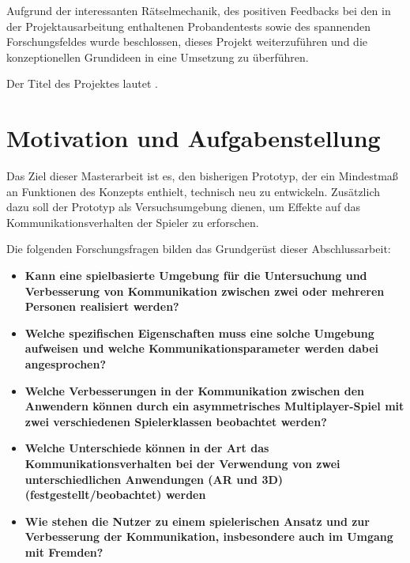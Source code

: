 Aufgrund der interessanten Rätselmechanik, des positiven Feedbacks bei den in der Projektausarbeitung enthaltenen Probandentests sowie des spannenden Forschungsfeldes wurde beschlossen, dieses Projekt weiterzuführen und die konzeptionellen Grundideen in eine Umsetzung zu überführen.

Der Titel des Projektes lautet .

\section{Motivation und Aufgabenstellung}
Das Ziel dieser Masterarbeit ist es, den bisherigen Prototyp, der ein Mindestmaß an Funktionen des Konzepts enthielt, technisch neu zu entwickeln. Zusätzlich dazu soll der Prototyp als Versuchsumgebung dienen, um Effekte auf das Kommunikationsverhalten der Spieler zu erforschen. 

Die folgenden Forschungsfragen bilden das Grundgerüst dieser Abschlussarbeit:


\begin{itemize}
    \item \textbf{Kann eine spielbasierte Umgebung für die Untersuchung und Verbesserung von Kommunikation zwischen zwei oder mehreren Personen realisiert werden?}
    \item \textbf{Welche spezifischen Eigenschaften muss eine solche Umgebung aufweisen und welche Kommunikationsparameter werden dabei angesprochen?}
    \item \textbf{Welche Verbesserungen in der Kommunikation zwischen den Anwendern können durch ein asymmetrisches Multiplayer-Spiel mit zwei verschiedenen Spielerklassen beobachtet werden?}
    \item \textbf{Welche Unterschiede können in der Art das Kommunikationsverhalten bei der Verwendung von zwei unterschiedlichen Anwendungen (AR und 3D) (festgestellt/beobachtet) werden}
    \item \textbf{Wie stehen die Nutzer zu einem spielerischen Ansatz und zur Verbesserung der Kommunikation, insbesondere auch im Umgang mit Fremden?}
\end{itemize}

